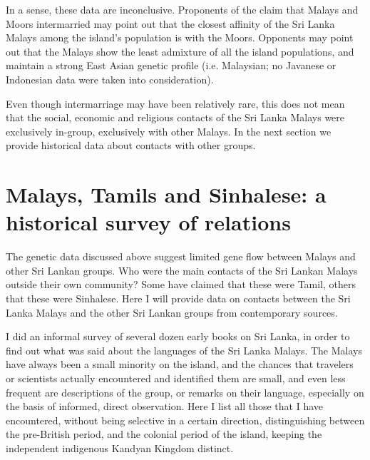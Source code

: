 In a sense, these data are inconclusive. Proponents of the claim that Malays and Moors intermarried may point out that the closest affinity of the Sri Lanka Malays among the island's population is with the Moors. Opponents may point out that the Malays show the least admixture of all the island populations, and maintain a strong East Asian genetic profile (i.e. Malaysian; no Javanese or Indonesian data were taken into consideration).

Even though intermarriage may have been relatively rare, this does not mean that the social, economic and religious contacts of the Sri Lanka Malays were exclusively in-group, exclusively with other Malays. In the next section we provide historical data about contacts with other groups.

\section[A historical survey of relations]{Malays, Tamils and Sinhalese: a historical survey of relations}\label{bakker:sec:3}
The genetic data discussed above suggest limited gene flow between Malays and other Sri Lankan groups. Who were the main contacts of the Sri Lankan Malays outside their own community? Some have claimed that these were Tamil, others that these were Sinhalese. Here I will provide data on contacts between the Sri Lanka Malays and the other Sri Lankan groups from contemporary sources. 

I did an informal survey of several dozen early books on Sri Lanka, in order to find out what was said about the languages of the Sri Lanka Malays. The Malays have always been a small minority on the island, and the chances that travelers or scientists actually encountered and identified them are small, and even less frequent are descriptions of the group, or remarks on their language, especially on the basis of informed, direct observation. Here I list all those that I have encountered, without being selective in a certain direction, distinguishing between the pre-British period, and the colonial period of the island, keeping the independent indigenous Kandyan Kingdom distinct.


